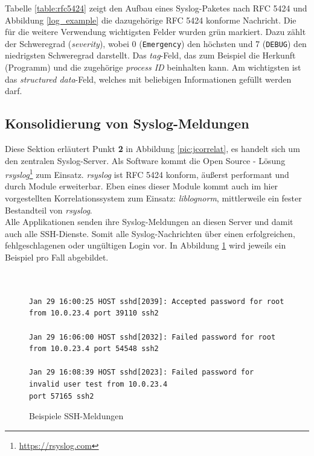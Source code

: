 Tabelle \ref{table:rfc5424} zeigt den Aufbau eines Syslog-Paketes nach RFC 5424 und 
Abbildung \ref{log_example} die dazugehörige RFC 5424 konforme Nachricht. Die für 
die weitere Verwendung wichtigsten Felder wurden grün markiert. Dazu zählt der 
Schweregrad (\textit{severity}), wobei 0 (\texttt{Emergency}) den höchsten und 7 
(\texttt{DEBUG}) 
den niedrigsten Schweregrad darstellt. Das \textit{tag}-Feld, das zum Beispiel die 
Herkunft (Programm) und die zugehörige \textit{process ID} beinhalten kann. Am 
wichtigsten ist das \textit{structured data}-Feld, welches mit beliebigen Informationen 
gefüllt werden darf.

\subsection{Konsolidierung von Syslog-Meldungen}\label{syslog-konsolidierung}

Diese Sektion erläutert Punkt \textbf{2} in Abbildung \ref{pic:jcorrelat}, es handelt 
sich um den zentralen Syslog-Server. Als Software kommt die Open Source - Lösung 
\textit{rsyslog}\footnote{\url{https://rsyslog.com}} zum Einsatz. \textit{rsyslog} ist 
RFC 5424 konform, äußerst performant und durch Module erweiterbar. Eben eines dieser 
Module kommt auch im hier vorgestellten Korrelationssystem zum Einsatz: 
\textit{liblognorm}, mittlerweile ein fester Bestandteil von \textit{rsyslog}.\\ 

Alle Applikationen senden ihre Syslog-Meldungen an diesen Server und damit auch alle 
SSH-Dienste. Somit alle Syslog-Nachrichten über einen erfolgreichen, 
fehlgeschlagenen oder ungültigen Login vor. In Abbildung \ref{ssh_example} wird 
jeweils ein Beispiel pro Fall abgebildet.

\begin{figure}[h]
    \caption{Beispiele SSH-Meldungen}
    \label{ssh_example}\vspace{0.2cm}
    \centering
    \begin{shaded*}
    \small{      
        \begin{verbatim}        


Jan 29 16:00:25 HOST sshd[2039]: Accepted password for root from 10.0.23.4 port 39110 ssh2
        
Jan 29 16:06:00 HOST sshd[2032]: Failed password for root from 10.0.23.4 port 54548 ssh2

Jan 29 16:08:39 HOST sshd[2023]: Failed password for invalid user test from 10.0.23.4 
port 57165 ssh2
\end{verbatim}}
\end{shaded*}
\end{figure}

